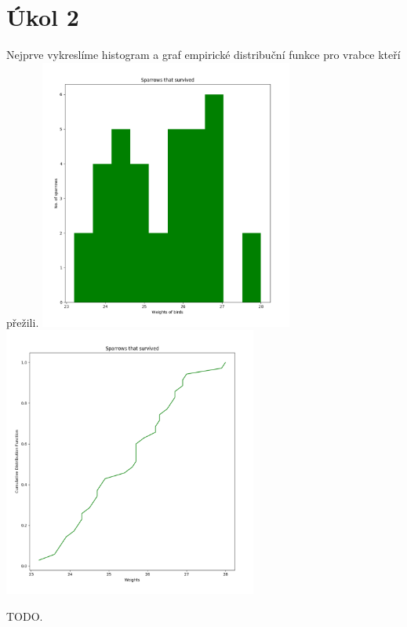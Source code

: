 \documentclass[12pt,a4paper]{article}
\begin{document}
\section{Úkol 2}
Nejprve vykreslíme histogram a graf empirické distribuční funkce pro vrabce kteří přežili. 
\includegraphics[height=3.5in]{survivedHist}
\includegraphics[height=3.5in]{survivedDist}

TODO.\par \bigskip
\end{document}
